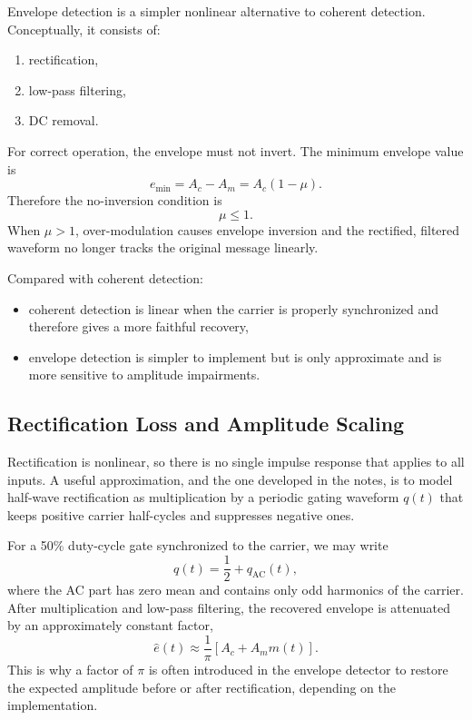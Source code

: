 Envelope detection is a simpler nonlinear alternative to coherent detection.
Conceptually, it consists of:
\begin{enumerate}
\item rectification,
\item low-pass filtering,
\item DC removal.
\end{enumerate}

For correct operation, the envelope must not invert. The
minimum envelope value is
\begin{equation}
e_{\min}=A_c-A_m=A_c(1-\mu).
\end{equation}
Therefore the no-inversion condition is
\begin{equation}
\mu \le 1.
\label{eq:lab2_no_inversion}
\end{equation}
When $\mu > 1$, over-modulation causes envelope inversion and the rectified,
filtered waveform no longer tracks the original message linearly.

Compared with coherent detection:
\begin{itemize}
\item coherent detection is linear when the carrier is properly synchronized and
therefore gives a more faithful recovery,
\item envelope detection is simpler to implement but is only approximate and is
more sensitive to amplitude impairments.
\end{itemize}

\subsection{Rectification Loss and Amplitude Scaling}

Rectification is nonlinear, so there is no single impulse response that applies
to all inputs. A useful approximation, and the one developed in the 
notes, is to model half-wave rectification as multiplication by a periodic
gating waveform $q(t)$ that keeps positive carrier half-cycles and suppresses
negative ones.

For a 50\% duty-cycle gate synchronized to the carrier, we may write
\begin{equation}
q(t)=\frac{1}{2}+q_{\mathrm{AC}}(t),
\end{equation}
where the AC part has zero mean and contains only odd harmonics of the carrier.
After multiplication and low-pass filtering, the recovered envelope is
attenuated by an approximately constant factor,
\begin{equation}
\hat{e}(t)\approx \frac{1}{\pi}\left[A_c + A_m m(t)\right].
\label{eq:lab2_pi_loss}
\end{equation}
This is why a factor of $\pi$ is often introduced in the envelope detector to
restore the expected amplitude before or after rectification, depending on the
implementation.

